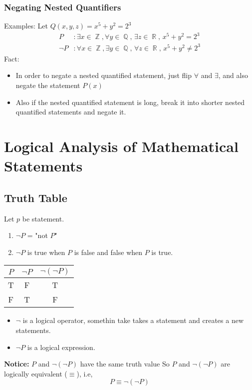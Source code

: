 \documentclass[10pt]{article}
\DeclareMathOperator{\Q}{{\mathbb{Q}}}
\DeclareMathOperator{\Z}{{\mathbb{Z}}}
\DeclareMathOperator{\R}{{\mathbb{R}}}
\theoremstyle{break}
\begin{document}
\subsubsection{Negating Nested Quantifiers}
Examples: 
Let $Q(x, y, z) = x^5 + y^2 = 2^3$\\
\begin{align*}
    P&: \exists x \in \Z, \forall y \in \Q, \, \exists z \in \R, \, x^5 + y^2 = 2^3\\
    \neg P&: \forall x \in \Z, \exists y \in \Q, \, \forall z \in \R, \, x^5 + y^2 \ne 2^3
\end{align*}
Fact: 
\begin{itemize}
    \item In order to negate a nested quantified statement, just flip $\forall$ and $\exists$, and also negate the statement $P(x)$
    \item Also if the nested quantified statement is long, break it into shorter nested quantified statements and negate it.
\end{itemize}


\section{Logical Analysis of Mathematical Statements}
\subsection{Truth Table}
Let $p$ be statement. 
\begin{enumerate}
    \item $\neg P$ = "not $P$"
    \item $\neg P$ is true when $P$ is false and false when $P$ is true.
\end{enumerate}

\begin{table}[ht]
\centering
\begin{tabular}{|c|c|c|}
    \hline
    $P$ & $\neg P$ & $\neg (\neg P)$ \\
    \hline
    T & F & T \\
    \hline
    F & T & F \\
    \hline
\end{tabular}
\end{table}

\begin{itemize}
    \item $\neg$ is a logical operator, somethin take takes a statement and creates a new statements.
    \item $\neg P$ is a logical expression.
\end{itemize}
\textbf{Notice:} $P$ and $\neg(\neg P)$ have the same truth value So $P$ and $\neg (\neg P)$ are logically equivalent ($\equiv$), i.e, 
$$P \equiv \neg (\neg P)$$ 
\end{document}
